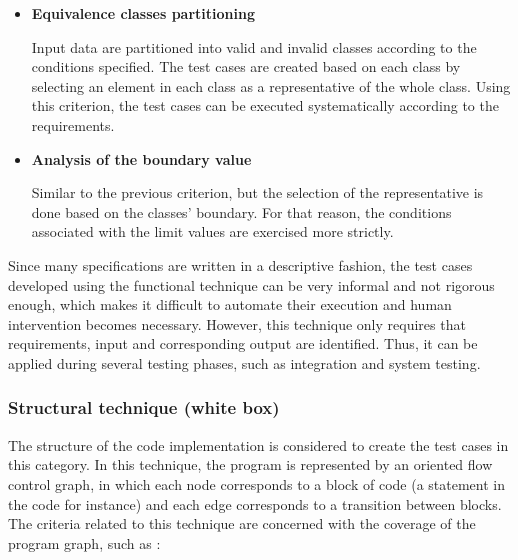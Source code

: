 	\begin{itemize}
	\item \textbf{Equivalence classes partitioning}
	
	Input data are partitioned into valid and invalid classes according to the conditions specified. The test cases are created based on each class by selecting an element in each class as a representative of the whole class. Using this criterion, the test cases can be executed systematically according to the requirements.

	\item \textbf{Analysis of the boundary value}
	
	Similar to the previous criterion, but the selection of the representative is done based on the classes' boundary. For that reason, the conditions associated with the limit values are exercised more strictly.

	\end{itemize}

Since many specifications are written in a descriptive fashion, the test cases developed using the functional technique can be very informal and not rigorous enough, which makes it difficult to automate their execution and human intervention becomes necessary. However, this technique only requires that requirements, input and corresponding output are identified. Thus, it can be applied during several testing phases, such as integration and system testing.

\subsubsection{Structural technique (white box)}
\label{strucTest}

The structure of the code implementation is considered to create the test cases in this category. In this technique, the program is represented by an oriented flow control graph, in which each node corresponds to a block of code (a statement in the code for instance) and each edge corresponds to a transition between blocks. The criteria related to this technique are concerned with the coverage of the program graph, such as \cite{Ammann:08}:

